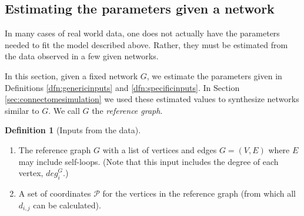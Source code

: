 \documentclass[11]{article}
\newcommand{\rB}{\mathcal{B}}
\theoremstyle{remark}
\theoremstyle{definition}
\newtheorem{dfn}[thm]{Definition}
\begin{document}

\subsection{Estimating the parameters given a network\label{sec:estimatedmodel}}

In many cases of real world data, one does not actually have the parameters needed to fit the model described above. Rather, they must be estimated from the data observed in a few given networks. 

In this section, given a fixed network $G$, we estimate the parameters given in Definitions \ref{dfn:genericinputs} and \ref{dfn:specificinputs}. In Section \ref{sec:connectomesimulation} we used these estimated values to synthesize networks similar to $G$. We call $G$ the {\it reference graph}.

\begin{dfn}[Inputs from the data]
\begin{enumerate}
    \item The reference graph $G$ with a list of vertices and edges $G= (V, E)$ where $E$ may include self-loops. (Note that this input includes the degree of each vertex, ${deg}_i^G$.)
    \item A set of coordinates $\mathcal{P}$ for the vertices in the reference graph (from which all $d_{i,j}$ can be calculated).
\end{enumerate}
\end{dfn}
\end{document}
